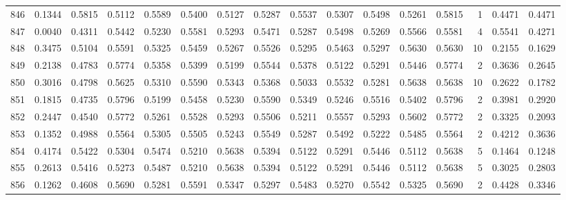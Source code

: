\begin{tabular}{lrrrrrrrrrrrrrrr}
846 &      0.1344 &  0.5815 &  0.5112 &  0.5589 &  0.5400 &  0.5127 &  0.5287 &  0.5537 &  0.5307 &  0.5498 &   0.5261 &     0.5815 &      1 &                    0.4471 &                     0.4471 \\
847 &      0.0040 &  0.4311 &  0.5442 &  0.5230 &  0.5581 &  0.5293 &  0.5471 &  0.5287 &  0.5498 &  0.5269 &   0.5566 &     0.5581 &      4 &                    0.5541 &                     0.4271 \\
848 &      0.3475 &  0.5104 &  0.5591 &  0.5325 &  0.5459 &  0.5267 &  0.5526 &  0.5295 &  0.5463 &  0.5297 &   0.5630 &     0.5630 &     10 &                    0.2155 &                     0.1629 \\
849 &      0.2138 &  0.4783 &  0.5774 &  0.5358 &  0.5399 &  0.5199 &  0.5544 &  0.5378 &  0.5122 &  0.5291 &   0.5446 &     0.5774 &      2 &                    0.3636 &                     0.2645 \\
850 &      0.3016 &  0.4798 &  0.5625 &  0.5310 &  0.5590 &  0.5343 &  0.5368 &  0.5033 &  0.5532 &  0.5281 &   0.5638 &     0.5638 &     10 &                    0.2622 &                     0.1782 \\
851 &      0.1815 &  0.4735 &  0.5796 &  0.5199 &  0.5458 &  0.5230 &  0.5590 &  0.5349 &  0.5246 &  0.5516 &   0.5402 &     0.5796 &      2 &                    0.3981 &                     0.2920 \\
852 &      0.2447 &  0.4540 &  0.5772 &  0.5261 &  0.5528 &  0.5293 &  0.5506 &  0.5211 &  0.5557 &  0.5293 &   0.5602 &     0.5772 &      2 &                    0.3325 &                     0.2093 \\
853 &      0.1352 &  0.4988 &  0.5564 &  0.5305 &  0.5505 &  0.5243 &  0.5549 &  0.5287 &  0.5492 &  0.5222 &   0.5485 &     0.5564 &      2 &                    0.4212 &                     0.3636 \\
854 &      0.4174 &  0.5422 &  0.5304 &  0.5474 &  0.5210 &  0.5638 &  0.5394 &  0.5122 &  0.5291 &  0.5446 &   0.5112 &     0.5638 &      5 &                    0.1464 &                     0.1248 \\
855 &      0.2613 &  0.5416 &  0.5273 &  0.5487 &  0.5210 &  0.5638 &  0.5394 &  0.5122 &  0.5291 &  0.5446 &   0.5112 &     0.5638 &      5 &                    0.3025 &                     0.2803 \\
856 &      0.1262 &  0.4608 &  0.5690 &  0.5281 &  0.5591 &  0.5347 &  0.5297 &  0.5483 &  0.5270 &  0.5542 &   0.5325 &     0.5690 &      2 &                    0.4428 &                     0.3346 \\

\end{tabular}
